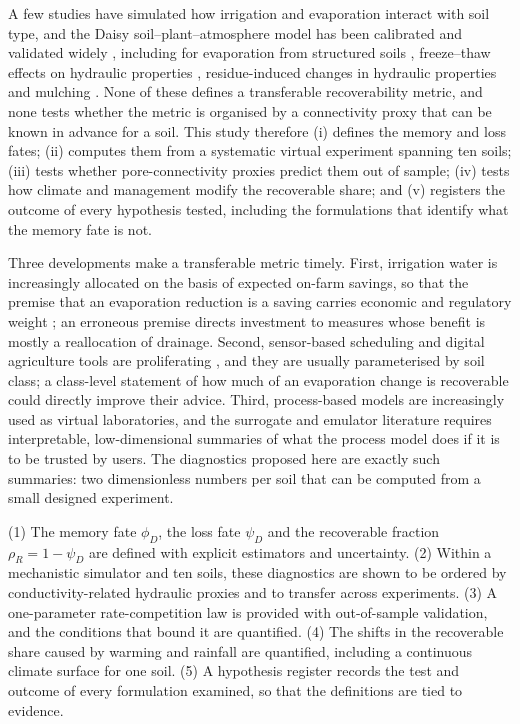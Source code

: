 A few studies have simulated how irrigation and evaporation interact with soil type, and the Daisy soil--plant--atmosphere model has been calibrated and validated widely \citep{Hansen1991,Hansen2012,Holbak2026}, including for evaporation from structured soils \citep{Leuther2024}, freeze--thaw effects on hydraulic properties \citep{Leuther2021,MirandaVelez2023}, residue-induced changes in hydraulic properties \citep{Leuther2026} and mulching \citep{Vuaille2024}. None of these defines a transferable recoverability metric, and none tests whether the metric is organised by a connectivity proxy that can be known in advance for a soil. This study therefore (i) defines the memory and loss fates; (ii) computes them from a systematic virtual experiment spanning ten soils; (iii) tests whether pore-connectivity proxies predict them out of sample; (iv) tests how climate and management modify the recoverable share; and (v) registers the outcome of every hypothesis tested, including the formulations that identify what the memory fate is not.

Three developments make a transferable metric timely. First, irrigation water is increasingly allocated on the basis of expected on-farm savings, so that the premise that an evaporation reduction is a saving carries economic and regulatory weight \citep{Perry2017,Pereira2012}; an erroneous premise directs investment to measures whose benefit is mostly a reallocation of drainage. Second, sensor-based scheduling and digital agriculture tools are proliferating \citep{Datta2023,Garcia2020}, and they are usually parameterised by soil class; a class-level statement of how much of an evaporation change is recoverable could directly improve their advice. Third, process-based models are increasingly used as virtual laboratories, and the surrogate and emulator literature \citep{Razavi2012,Asher2015} requires interpretable, low-dimensional summaries of what the process model does if it is to be trusted by users. The diagnostics proposed here are exactly such summaries: two dimensionless numbers per soil that can be computed from a small designed experiment.

(1) The memory fate $\phi_D$, the loss fate $\psi_D$ and the recoverable fraction $\rho_R=1-\psi_D$ are defined with explicit estimators and uncertainty. (2) Within a mechanistic simulator and ten soils, these diagnostics are shown to be ordered by conductivity-related hydraulic proxies and to transfer across experiments. (3) A one-parameter rate-competition law is provided with out-of-sample validation, and the conditions that bound it are quantified. (4) The shifts in the recoverable share caused by warming and rainfall are quantified, including a continuous climate surface for one soil. (5) A hypothesis register records the test and outcome of every formulation examined, so that the definitions are tied to evidence.

